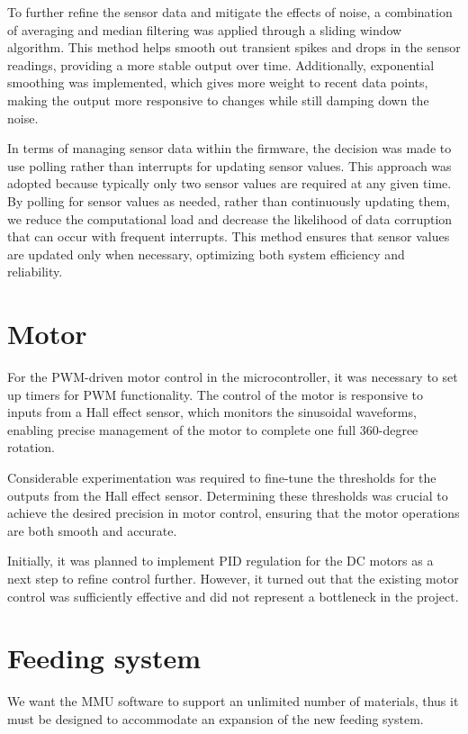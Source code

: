 To further refine the sensor data and mitigate the effects of noise, a combination of averaging and median filtering was applied through a sliding window algorithm. This method helps smooth out transient spikes and drops in the sensor readings, providing a more stable output over time. Additionally, exponential smoothing was implemented, which gives more weight to recent data points, making the output more responsive to changes while still damping down the noise.

In terms of managing sensor data within the firmware, the decision was made to use polling rather than interrupts for updating sensor values. This approach was adopted because typically only two sensor values are required at any given time. By polling for sensor values as needed, rather than continuously updating them, we reduce the computational load and decrease the likelihood of data corruption that can occur with frequent interrupts. This method ensures that sensor values are updated only when necessary, optimizing both system efficiency and reliability.

\section{Motor}

For the PWM-driven motor control in the microcontroller, it was necessary to set up timers for PWM \cite{pwm} functionality. The control of the motor is responsive to inputs from a Hall effect sensor, which monitors the sinusoidal waveforms, enabling precise management of the motor to complete one full 360-degree rotation.

Considerable experimentation was required to fine-tune the thresholds for the outputs from the Hall effect sensor. Determining these thresholds was crucial to achieve the desired precision in motor control, ensuring that the motor operations are both smooth and accurate.

Initially, it was planned to implement PID \cite{pid} regulation for the DC motors as a next step to refine control further. However, it turned out that the existing motor control was sufficiently effective and did not represent a bottleneck in the project.

\section{Feeding system}

We want the MMU software to support an unlimited number of materials, thus it must be designed to accommodate an expansion of the new feeding system.

